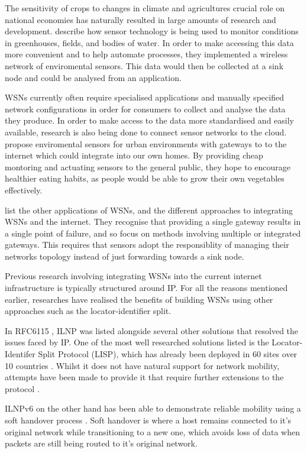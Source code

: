 \documentclass[12pt]{article}
\begin{document}
The sensitivity of crops to changes in climate and agricultures crucial role on national economies has naturally resulted in large amounts of research and development. \cite{agrisensor} describe how sensor technology is being used to monitor conditions in greenhouses, fields, and bodies of water. In order to make accessing this data more convenient and to help automate processes, they implemented a wireless network of enviromental sensors. This data would then be collected at a sink node and could be analysed from an application. 

WSNs currently often require specialised applications and manually specified network configurations in order for consumers to collect and analyse the data they produce. In order to make access to the data more standardised and easily available, research is also being done to connect sensor networks to the cloud. \cite{indoor} propose enviromental sensors for urban environments with gateways to to the internet which could integrate into our own homes. By providing cheap montoring and actuating sensors to the general public, they hope to encourage healthier eating habits, as people would be able to grow their own vegetables effectively. 

\cite{wsnlist} list the other applications of WSNs, and the different approaches to integrating WSNs and the internet. They recognise that providing a single gateway results in a single point of failure, and so focus on methods involving multiple or integrated gateways. This requires that sensors adopt the responsiblity of managing their networks topology instead of just forwarding towards a sink node. 

Previous research involving integrating WSNs into the current internet infrastructure is typically structured around IP. For all the reasons mentioned earlier, researches have realised the benefits of building WSNs using other approaches such as the locator-identifier split.

In RFC6115 \cite{rfc6115}, ILNP was listed alongside several other solutions that resolved the issues faced by IP. One of the most well researched solutions listed is the Locator-Identifer Split Protocol (LISP), which has already been deployed in 60 sites over 10 countries \cite{nahla}. Whilst it does not have natural support for network mobility, attempts have been made to provide it that require further extensions to the protocol \cite{moblisp}. 

ILNPv6 on the other hand has been able to demonstrate reliable mobility using a soft handover process \cite{shilnp}. Soft handover is where a host remains connected to it's original network while transitioning to a new one, which avoids loss of data when packets are still being routed to it's original network. 
\end{document}
